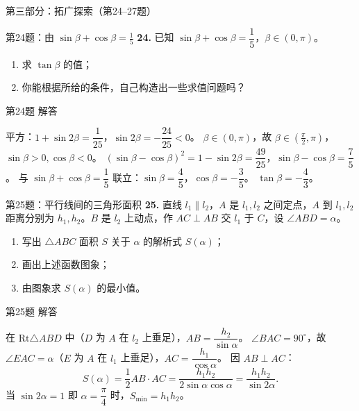 \documentclass[10pt,aspectratio=169,serif]{beamer}
\begin{document}
\begin{frame}{第三部分：拓广探索（第24--27题）}
\end{frame}

\begin{frame}[t]{第24题：由 $\sin\beta+\cos\beta=\frac15$}
\textbf{24.} 已知 $\sin\beta+\cos\beta=\dfrac15$，$\beta\in(0,\pi)$。
\begin{enumerate}
  \item 求 $\tan\beta$ 的值；
  \item 你能根据所给的条件，自己构造出一些求值问题吗？
\end{enumerate}
\end{frame}

\begin{frame}[t]{第24题 解答}
\begin{tcolorbox}[colback=orange!10,colframe=orange,title=\textbf{解}]
平方：$1+\sin 2\beta=\dfrac1{25}$，$\sin 2\beta=-\dfrac{24}{25}<0$。
$\beta\in(0,\pi)$，故 $\beta\in(\frac{\pi}{2},\pi)$，$\sin\beta>0,\cos\beta<0$。
$(\sin\beta-\cos\beta)^2=1-\sin 2\beta=\dfrac{49}{25}$，$\sin\beta-\cos\beta=\dfrac75$。
与 $\sin\beta+\cos\beta=\dfrac15$ 联立：$\sin\beta=\dfrac45$，$\cos\beta=-\dfrac35$。
\alert{$\tan\beta=-\dfrac43$}。
\end{tcolorbox}
\end{frame}

\begin{frame}[t]{第25题：平行线间的三角形面积}
\textbf{25.} 直线 $l_1\parallel l_2$，$A$ 是 $l_1,l_2$ 之间定点，$A$ 到 $l_1,l_2$ 距离分别为 $h_1,h_2$。$B$ 是 $l_2$ 上动点，作 $AC\perp AB$ 交 $l_1$ 于 $C$，设 $\angle ABD=\alpha$。
\begin{enumerate}
  \item 写出 $\triangle ABC$ 面积 $S$ 关于 $\alpha$ 的解析式 $S(\alpha)$；
  \item 画出上述函数图象；
  \item 由图象求 $S(\alpha)$ 的最小值。
\end{enumerate}
\end{frame}

\begin{frame}[t]{第25题 解答}
\begin{tcolorbox}[colback=orange!10,colframe=orange,title=\textbf{解}]
在 $\text{Rt}\triangle ABD$ 中（$D$ 为 $A$ 在 $l_2$ 上垂足），$AB=\dfrac{h_2}{\sin\alpha}$。
$\angle BAC=90^\circ$，故 $\angle EAC=\alpha$（$E$ 为 $A$ 在 $l_1$ 上垂足），$AC=\dfrac{h_1}{\cos\alpha}$。
因 $AB\perp AC$：
\[
S(\alpha)=\frac12 AB\cdot AC=\frac{h_1h_2}{2\sin\alpha\cos\alpha}=\frac{h_1h_2}{\sin 2\alpha}.
\]
当 $\sin 2\alpha=1$ 即 $\alpha=\dfrac{\pi}{4}$ 时，$S_{\min}=h_1h_2$。
\end{tcolorbox}
\end{frame}
\end{document}
